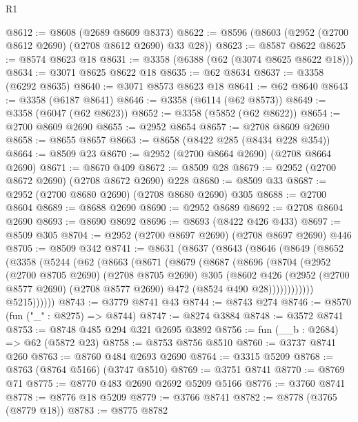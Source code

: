 \begin{lexlean}{R1}
\begin{coremodule}
@8612 := @8608 (@2689 @8609 @8373)
@8622 := @8596 (@8603 (@2952 (@2700 @8612 @2690) (@2708 @8612 @2690) @33 @28))
@8623 := @8587 @8622
@8625 := @8574 @8623 @18
@8631 := @3358 (@6388 (@62 (@3074 @8625 @8622 @18)))
@8634 := @3071 @8625 @8622 @18
@8635 := @62 @8634
@8637 := @3358 (@6292 @8635)
@8640 := @3071 @8573 @8623 @18
@8641 := @62 @8640
@8643 := @3358 (@6187 @8641)
@8646 := @3358 (@6114 (@62 @8573))
@8649 := @3358 (@6047 (@62 @8623))
@8652 := @3358 (@5852 (@62 @8622))
@8654 := @2700 @8609 @2690
@8655 := @2952 @8654
@8657 := @2708 @8609 @2690
@8658 := @8655 @8657
@8663 := @8658 (@8422 @285 (@8434 @228 @354))
@8664 := @8509 @23
@8670 := @2952 (@2700 @8664 @2690) (@2708 @8664 @2690)
@8671 := @8670 @409
@8672 := @8509 @28
@8679 := @2952 (@2700 @8672 @2690) (@2708 @8672 @2690) @228
@8680 := @8509 @33
@8687 := @2952 (@2700 @8680 @2690) (@2708 @8680 @2690) @305
@8688 := @2700 @8604
@8689 := @8688 @2690
@8690 := @2952 @8689
@8692 := @2708 @8604 @2690
@8693 := @8690 @8692
@8696 := @8693 (@8422 @426 @433)
@8697 := @8509 @305
@8704 := @2952 (@2700 @8697 @2690) (@2708 @8697 @2690) @446
@8705 := @8509 @342
@8741 := @8631
    (@8637
      (@8643
        (@8646
          (@8649
            (@8652
              (@3358
                (@5244
                  (@62
                    (@8663
                      (@8671
                        (@8679
                          (@8687
                            (@8696
                              (@8704
                                (@2952
                                  (@2700 @8705 @2690)
                                  (@2708 @8705 @2690)
                                  @305
                                  (@8602
                                    @426
                                    (@2952
                                      (@2700 @8577 @2690)
                                      (@2708 @8577 @2690)
                                      @472
                                      (@8524 @490 @28))))))))))))
                @5215))))))
@8743 := @3779 @8741 @43
@8744 := @8743 @274
@8746 := @8570 (fun ("_" : @8275) => @8744)
@8747 := @8274 @3884
@8748 := @3572 @8741
@8753 := @8748 @485 @294 @321 @2695 @3892
@8756 := fun (__b : @2684) => @62 (@5872 @23)
@8758 := @8753 @8756 @8510
@8760 := @3737 @8741 @260
@8763 := @8760 @484 @2693 @2690
@8764 := @3315 @5209
@8768 := @8763 (@8764 @5166) (@3747 @8510)
@8769 := @3751 @8741
@8770 := @8769 @71
@8775 := @8770 @483 @2690 @2692 @5209 @5166
@8776 := @3760 @8741
@8778 := @8776 @18 @5209
@8779 := @3766 @8741
@8782 := @8778 (@3765 (@8779 @18))
@8783 := @8775 @8782

\end{coremodule}
\end{lexlean}
